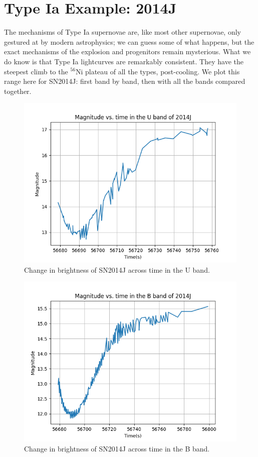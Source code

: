 \section{Type Ia Example: 2014J}
The mechanisms of Type Ia supernovae are, like most other supernovae, only gestured at by modern astrophysics; we can guess some of what happens, but the exact mechanisms of the explosion and progenitors remain mysterious. What we do know is that Type Ia lightcurves are remarkably consistent. They have the steepest climb to the $^{56}$Ni plateau of all the types, post-cooling. We plot this range here for SN2014J: first band by band, then with all the bands compared together.
\begin{figure}[h]
	\includegraphics[width=1.0\textwidth]{2014J_U_magvstime.png}
	\caption{Change in brightness of SN2014J across time in the U band.}
\end{figure}
\begin{figure}[h]
	\includegraphics[width=1.0\textwidth]{2014J_B_magvstime.png}
	\caption{Change in brightness of SN2014J across time in the B band.}
\end{figure}
